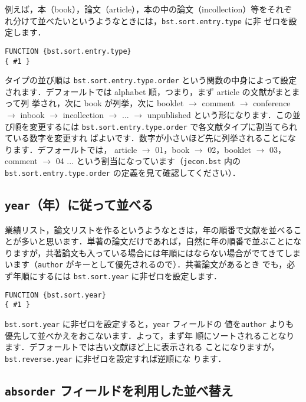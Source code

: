 \documentclass[article]{jlreq}
\begin{document}
例えば，本（book），論文（article），本の中の論文（incollection）等をそれぞ
れ分けて並べたいというようなときには，\texttt{bst.sort.entry.type} に非
ゼロを設定します．
\begin{screen}
\begin{verbatim}
FUNCTION {bst.sort.entry.type}
{ #1 }
\end{verbatim}
\end{screen}

タイプの並び順は \texttt{bst.sort.entry.type.order} という関数の中身によって設定
されます．デフォールトでは alphabet 順，つまり，まず article の文献がまとまって列
挙され，次に book が列挙，次に booklet $\rightarrow$ comment $\rightarrow$
conference $\rightarrow$ inbook $\rightarrow$ incollection $\rightarrow$
... $\rightarrow$ unpublished という形になります．この並び順を変更するには
\texttt{bst.sort.entry.type.order} で各文献タイプに割当てられている数字を変更すれ
ばよいです．数字が小さいほど先に列挙されることになります．デフォールトでは，
article $\rightarrow$ 01，book $\rightarrow$ 02，booklet $\rightarrow$ 03，
comment $\rightarrow$ 04 ... という割当になっています（\texttt{jecon.bst} 内の
\texttt{bst.sort.entry.type.order} の定義を見て確認してください）．

\subsection{\texttt{year}（年）に従って並べる}

業績リスト，論文リストを作るというようなときは，年の順番で文献を並べるこ
とが多いと思います．単著の論文だけであれば，自然に年の順番で並ぶことにな
りますが，共著論文も入っている場合には年順にはならない場合がでてきてしま
います（\texttt{author} がキーとして優先されるので）．共著論文があるとき
でも，必ず年順にするには \texttt{bst.sort.year} に非ゼロを設定します．
\begin{screen}
\begin{verbatim}
FUNCTION {bst.sort.year}
{ #1 }
\end{verbatim}
\end{screen}
\texttt{bst.sort.year} に非ゼロを設定すると，\texttt{year} フィールドの
値を\texttt{author} よりも優先して並べかえをおこないます．よって，まず年
順にソートされることなります．デフォールトでは古い文献ほど上に表示される
ことになりますが，\texttt{bst.reverse.year} に非ゼロを設定すれば逆順にな
ります．


\subsection{\texttt{absorder} フィールドを利用した並べ替え}
\end{document}
